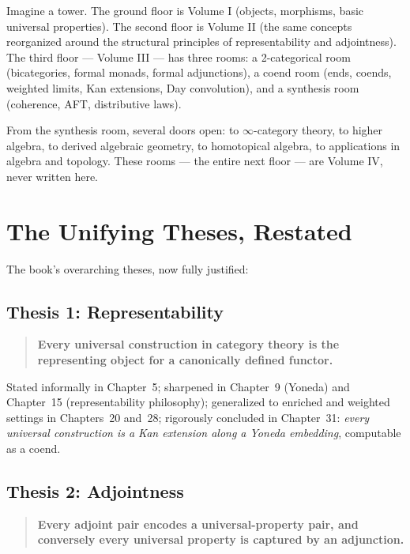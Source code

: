 \begin{remark}
Imagine a tower. The ground floor is Volume I (objects, morphisms, basic
universal properties). The second floor is Volume II (the same concepts
reorganized around the structural principles of representability and
adjointness). The third floor — Volume III — has three rooms: a 2-categorical
room (bicategories, formal monads, formal adjunctions), a coend room
(ends, coends, weighted limits, Kan extensions, Day convolution), and a
synthesis room (coherence, AFT, distributive laws).

From the synthesis room, several doors open: to $\infty$-category theory,
to higher algebra, to derived algebraic geometry, to homotopical algebra,
to applications in algebra and topology. These rooms — the entire next
floor — are Volume IV, never written here.
\end{remark}


\section{The Unifying Theses, Restated}
\label{sec:unifying-theses}

The book's overarching theses, now fully justified:

\subsection{Thesis 1: Representability}

\begin{quote}
\textbf{Every universal construction in category theory is the representing
object for a canonically defined functor.}
\end{quote}

\noindent Stated informally in Chapter~5; sharpened in Chapter~9 (Yoneda) and
Chapter~15 (representability philosophy); generalized to enriched and
weighted settings in Chapters~20 and~28; rigorously concluded in Chapter~31:
\emph{every universal construction is a Kan extension along a Yoneda
embedding}, computable as a coend.

\subsection{Thesis 2: Adjointness}

\begin{quote}
\textbf{Every adjoint pair encodes a universal-property pair, and conversely
every universal property is captured by an adjunction.}
\end{quote}

